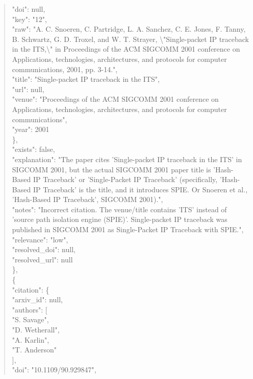 \documentclass[11pt]{article}
\begin{document}
\begin{quote}
        "doi": null,\\
        "key": "12",\\
        "raw": "A. C. Snoeren, C. Partridge, L. A. Sanchez, C. E. Jones, F. Tanny, B. Schwartz, G. D. Troxel, and W. T. Strayer, \textbackslash{}"Single-packet IP traceback in the ITS,\textbackslash{}" in Proceedings of the ACM SIGCOMM 2001 conference on Applications, technologies, architectures, and protocols for computer communications, 2001, pp. 3-14.",\\
        "title": "Single-packet IP traceback in the ITS",\\
        "url": null,\\
        "venue": "Proceedings of the ACM SIGCOMM 2001 conference on Applications, technologies, architectures, and protocols for computer communications",\\
        "year": 2001\\
      \},\\
      "exists": false,\\
      "explanation": "The paper cites 'Single-packet IP traceback in the ITS' in SIGCOMM 2001, but the actual SIGCOMM 2001 paper title is 'Hash-Based IP Traceback' or 'Single-Packet IP Traceback' (specifically, 'Hash-Based IP Traceback' is the title, and it introduces SPIE. Or Snoeren et al., 'Hash-Based IP Traceback', SIGCOMM 2001).",\\
      "notes": "Incorrect citation. The venue/title contains 'ITS' instead of 'source path isolation engine (SPIE)'. Single-packet IP traceback was published in SIGCOMM 2001 as Single-Packet IP Traceback with SPIE.",\\
      "relevance": "low",\\
      "resolved\_doi": null,\\
      "resolved\_url": null\\
    \},\\
    \{\\
      "citation": \{\\
        "arxiv\_id": null,\\
        "authors": [\\
          "S. Savage",\\
          "D. Wetherall",\\
          "A. Karlin",\\
          "T. Anderson"\\
        ],\\
        "doi": "10.1109/90.929847",\\

\end{quote}
\end{document}
